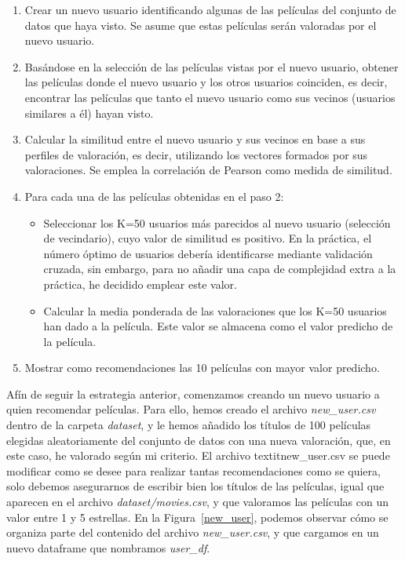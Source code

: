 \documentclass{uimppracticas}
\begin{document}
\begin{enumerate}
	\item Crear un nuevo usuario identificando algunas de las películas del conjunto de datos que haya visto. Se asume que estas películas serán valoradas por el nuevo usuario.
	\item Basándose en la selección de las películas vistas por el nuevo usuario, obtener las películas donde el nuevo usuario y los otros usuarios coinciden, es decir, encontrar las películas que tanto el nuevo usuario como sus vecinos (usuarios similares a él) hayan visto.
	\item Calcular la similitud entre el nuevo usuario y sus vecinos en base a sus perfiles de valoración, es decir, utilizando los vectores formados por sus valoraciones. Se emplea la correlación de Pearson como medida de similitud.
	\item Para cada una de las películas obtenidas en el paso 2:
		\begin{itemize}
			\item Seleccionar los K=50 usuarios más parecidos al nuevo usuario (selección de vecindario), cuyo valor de similitud es positivo. En la práctica, el número óptimo de usuarios debería identificarse mediante validación cruzada, sin embargo, para no añadir una capa de complejidad extra a la práctica, he decidido emplear este valor.
			\item Calcular la media ponderada de las valoraciones que los K=50 usuarios han dado a la película. Este valor se almacena como el valor predicho de la película.
		\end{itemize}	
	\item Mostrar como recomendaciones las 10 películas con mayor valor predicho.
\end{enumerate}

Afín de seguir la estrategia anterior, comenzamos creando un nuevo usuario a quien recomendar películas. Para ello, hemos creado el archivo \textit{new\_user.csv} dentro de la carpeta \textit{dataset}, y le hemos añadido los títulos de 100 películas elegidas aleatoriamente del conjunto de datos con una nueva valoración, que, en este caso, he valorado según mi criterio. El archivo textit{new\_user.csv} se puede modificar como se desee para realizar tantas recomendaciones como se quiera, solo debemos asegurarnos de escribir bien los títulos de las películas, igual que aparecen en el archivo \textit{dataset/movies.csv}, y que valoramos las películas con un valor entre 1 y 5 estrellas. En la Figura~\ref{new_user}, podemos observar cómo se organiza parte del contenido del archivo \textit{new\_user.csv}, y que cargamos en un nuevo dataframe que nombramos \textit{user\_df}.
\end{document}
